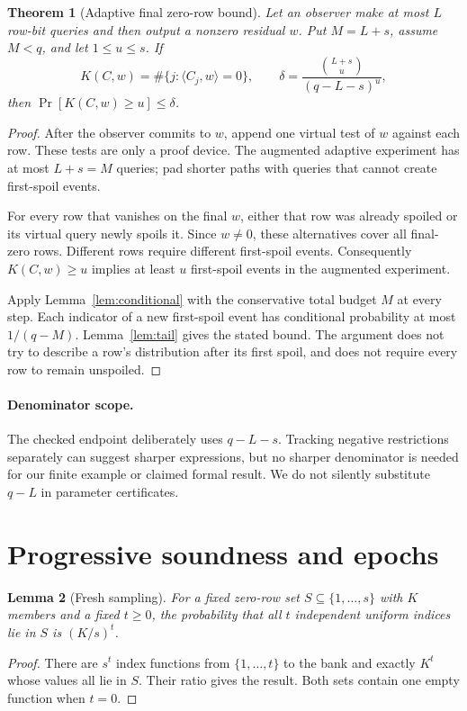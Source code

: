 \documentclass[11pt,letterpaper]{article}
\newtheorem{theorem}{Theorem}[section]
\newtheorem{lemma}[theorem]{Lemma}
\theoremstyle{definition}
\newcommand{\Prb}{\mathop{\mathrm{Pr}}}
\newcommand{\dotp}[2]{\langle #1,#2\rangle}
\begin{document}
\begin{theorem}[Adaptive final zero-row bound]
\label{thm:pool}
Let an observer make at most $L$ row-bit queries and then output a nonzero residual $w$. Put $M=L+s$, assume $M<q$, and let $1\le u\le s$. If
\[
 K(C,w)=\#\{j:\dotp{C_j}{w}=0\},\qquad
 \delta=\frac{\binom{L+s}{u}}{(q-L-s)^u},
\]
then $\Prb[K(C,w)\ge u]\le\delta$.
\end{theorem}
\begin{proof}
After the observer commits to $w$, append one virtual test of $w$ against each row. These tests are only a proof device. The augmented adaptive experiment has at most $L+s=M$ queries; pad shorter paths with queries that cannot create first-spoil events.

For every row that vanishes on the final $w$, either that row was already spoiled or its virtual query newly spoils it. Since $w\ne0$, these alternatives cover all final-zero rows. Different rows require different first-spoil events. Consequently $K(C,w)\ge u$ implies at least $u$ first-spoil events in the augmented experiment.

Apply Lemma~\ref{lem:conditional} with the conservative total budget $M$ at every step. Each indicator of a new first-spoil event has conditional probability at most $1/(q-M)$. Lemma~\ref{lem:tail} gives the stated bound. The argument does not try to describe a row's distribution after its first spoil, and does not require every row to remain unspoiled.
\end{proof}

\paragraph{Denominator scope.}
The checked endpoint deliberately uses $q-L-s$. Tracking negative restrictions separately can suggest sharper expressions, but no sharper denominator is needed for our finite example or claimed formal result. We do not silently substitute $q-L$ in parameter certificates.

\section{Progressive soundness and epochs}
\label{sec:soundness}
\begin{lemma}[Fresh sampling]
For a fixed zero-row set $S\subseteq\{1,\ldots,s\}$ with $K$ members and a fixed $t\ge0$, the probability that all $t$ independent uniform indices lie in $S$ is $(K/s)^t$.
\end{lemma}
\begin{proof}
There are $s^t$ index functions from $\{1,\ldots,t\}$ to the bank and exactly $K^t$ whose values all lie in $S$. Their ratio gives the result. Both sets contain one empty function when $t=0$.
\end{proof}
\end{document}
